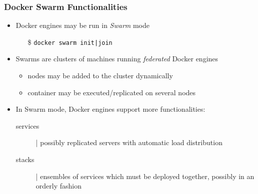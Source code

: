 \documentclass[presentation]{beamer}\mode<presentation>{\usetheme{AMSBolognaFC}}
\begin{document}
\begin{frame}%
    \frametitle{Docker Swarm Functionalities}
    \label{frame:swarm}

    \begin{itemize}
        \item Docker engines may be run in \emph{Swarm} mode
        \begin{itemize}
            \item[\$] \texttt{docker swarm init{\color{gray}|join}}
        \end{itemize}

        \vfill

        \item Swarms are \alert{clusters} of machines running \emph{federated} Docker engines
        \begin{itemize}
            \item nodes may be added to the cluster dynamically
            \item container may be executed/replicated on several nodes
        \end{itemize}

        \vfill

        \item In Swarm mode, Docker engines support more functionalities:
        \begin{description}
                \item[services] | possibly \alert{replicated} servers with automatic load distribution
            \item[stacks] | ensembles of services which must be deployed together, possibly in an orderly fashion
        \end{description}
    \end{itemize}

\end{frame}



\end{document}

